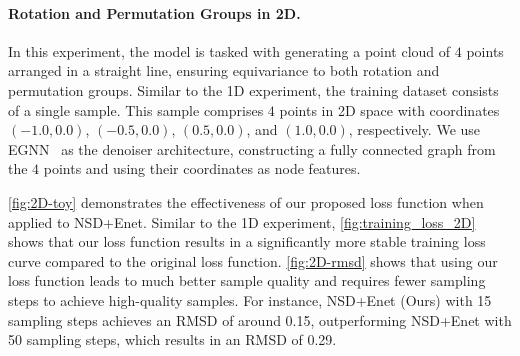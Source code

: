 \paragraph{Rotation and Permutation Groups in 2D.} 
In this experiment, the model is tasked with generating a point cloud of \( 4 \) points arranged in a straight line, ensuring equivariance to both rotation and permutation groups. Similar to the 1D experiment, the training dataset consists of a single sample. This sample comprises \( 4 \) points in 2D space with coordinates \((-1.0, 0.0)\), \((-0.5, 0.0)\), \((0.5, 0.0)\), and \((1.0, 0.0)\), respectively. We use EGNN~ as the denoiser architecture, constructing a fully connected graph from the \( 4 \) points and using their coordinates as node features. 





\cref{fig:2D-toy} demonstrates the effectiveness of our proposed loss function when applied to NSD+Enet. Similar to the 1D experiment, \cref{fig:training_loss_2D} shows that our loss function results in a significantly more stable training loss curve compared to the original loss function. \cref{fig:2D-rmsd} 
shows that using our loss function leads to much better sample quality and requires fewer sampling steps to achieve high-quality samples. For instance, NSD+Enet (Ours) with 15 sampling steps achieves an RMSD of around 0.15, outperforming NSD+Enet with 50 sampling steps, which results in an RMSD of 0.29.
